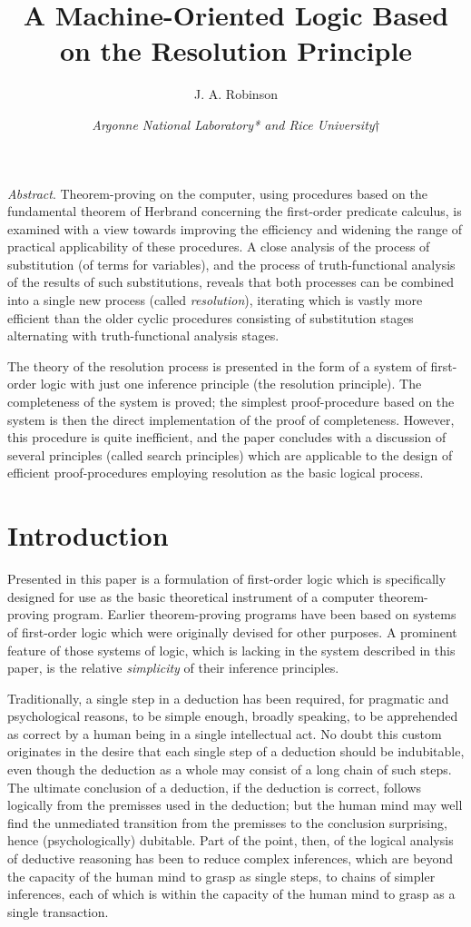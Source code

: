 \documentclass[8pt]{extarticle}
\title{\textbf{ A Machine-Oriented Logic Based on the Resolution Principle}}
\author{J. A. Robinson}
\date{\emph{Argonne National Laboratory* and Rice University$\dagger$}}
\begin{document}
\maketitle


\textit{Abstract}. Theorem-proving on the computer, using procedures based on the fundamental theorem of Herbrand concerning the first-order predicate calculus, is examined with a view towards improving the efficiency and widening the range of practical applicability of these procedures. A close analysis of the process of substitution (of terms for variables), and the process of truth-functional analysis of the results of such substitutions, reveals that both processes can be combined into a single new process (called \emph{resolution}), iterating which is vastly more efficient than the older cyclic procedures consisting of substitution stages alternating with truth-functional analysis stages.

The theory of the resolution process is presented in the form of a system of first-order logic with just one inference principle (the resolution principle). The completeness of the system is proved; the simplest proof-procedure based on the system is then the direct implementation of the proof of completeness. However, this procedure is quite inefficient, and the paper concludes with a discussion of several principles (called search principles) which are applicable to the design of efficient proof-procedures employing resolution as the
basic logical process.

\section{Introduction}
Presented in this paper is a formulation of first-order logic which is specifically designed for use as the basic theoretical instrument of a computer theorem-proving program. Earlier theorem-proving programs have been based on systems of first-order logic which were originally devised for other purposes. A prominent feature of those systems of logic, which is lacking in the system described in this paper, is the relative \emph{simplicity} of their inference principles.

Traditionally, a single step in a deduction has been required, for pragmatic and psychological reasons, to be simple enough, broadly speaking, to be apprehended as correct by a human being in a single intellectual act. No doubt this custom originates in the desire that each single step of a deduction should be indubitable, even though the deduction as a whole may consist of a long chain of such steps. The ultimate conclusion of a deduction, if the deduction is correct, follows logically from the premisses used in the  deduction; but the human mind may well find the unmediated transition from the premisses to the conclusion surprising, hence (psychologically) dubitable. Part of the point, then, of the logical analysis of deductive reasoning has been to reduce complex inferences, which are beyond the capacity of the human mind to grasp as single steps, to chains of simpler inferences, each of which is within the capacity of the human mind to grasp as a
single transaction.
\vspace{0.3cm}
\end{document}
